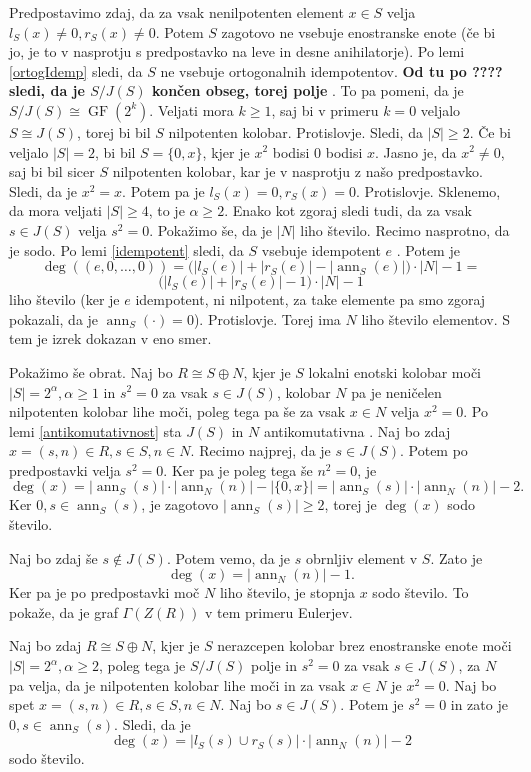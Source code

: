 \documentclass[a4paper, 12pt]{amsart}
\theoremstyle{definition} %
\theoremstyle{plain} %
\DeclareMathOperator{\ann}{ann}
\DeclareMathOperator{\GF}{GF}
\begin{document}
Predpostavimo zdaj, da za vsak nenilpotenten element $x \in S$ velja $l_S(x) \neq 0, r_S(x) \neq 0$. Potem $S$ zagotovo ne vsebuje enostranske enote (če bi jo, je to v nasprotju s predpostavko na leve in desne anihilatorje). Po lemi \ref{ortogIdemp} sledi, da $S$ ne vsebuje ortogonalnih idempotentov. {	\bf Od tu po ???? sledi, da je $S/J(S)$  končen obseg, torej polje }. To pa pomeni, da je $S/J(S) \cong \GF(2^k)$. Veljati mora $k\ge 1$, saj bi v primeru $k=0$ veljalo $S \cong J(S)$, torej bi bil $S$ nilpotenten kolobar. Protislovje. Sledi, da $|S| \ge 2$. Če bi veljalo $|S| = 2$, bi bil $S=\{0,x\}$, kjer je $x^2$ bodisi $0$ bodisi $x$. Jasno je, da $x^2 \neq 0$, saj bi bil sicer $S$ nilpotenten kolobar, kar je v nasprotju z našo predpostavko. Sledi, da je $x^2 = x$. Potem pa je $l_S(x) = 0, r_S(x) = 0$. Protislovje. Sklenemo, da mora veljati $|S| \ge 4$, to je $\alpha \ge 2$. Enako kot zgoraj sledi tudi, da za vsak $ s \in J(S)$ velja $s^2 = 0$. Pokažimo še, da je $|N| $ liho število. Recimo nasprotno, da je sodo. Po lemi \ref{idempotent} sledi, da $S$ vsebuje idempotent $e$ . Potem je 
$$
\deg((e,0,\dots,0)) = \big(|l_S(e)| + |r_S(e)| - |\ann_S(e)| \big)\cdot |N| -1 =
$$
$$
 \big(|l_S(e)| + |r_S(e)| - 1 \big)\cdot |N| -1
$$
liho število (ker je $e$ idempotent, ni nilpotent, za take elemente pa smo zgoraj pokazali, da je $\ann_S(\cdot) = 0$). Protislovje. Torej ima $N$ liho število elementov. S tem je izrek dokazan v eno smer.

Pokažimo še obrat. Naj bo $R\cong S\oplus N$, kjer je $S$ lokalni enotski kolobar moči $|S| = 2^{\alpha}, \alpha \ge 1$ in $s^2 = 0 $ za vsak $s\in J(S)$, kolobar $N$ pa je neničelen nilpotenten kolobar lihe moči, poleg tega pa še za vsak $x\in N$ velja $x^2 = 0$. Po lemi \ref{antikomutativnost} sta $J(S)$ in $N$ antikomutativna . Naj bo zdaj $x= (s,n) \in R, s\in S, n\in N$. Recimo najprej, da je $s\in J(S)$. Potem po predpostavki velja $s^2 = 0$. Ker pa je poleg tega še $n^2 = 0$, je 
$$
\deg(x) = |\ann_S(s)|\cdot|\ann_N(n)| - |\{0,x\}| =   |\ann_S(s)|\cdot|\ann_N(n)| - 2.
$$
Ker $0,s\in \ann_S(s)$, je zagotovo $|\ann_S(s)|\ge 2$, torej je $\deg(x)$ sodo število.

Naj bo zdaj še $s\notin J(S)$. Potem vemo, da je $s$ obrnljiv element v $S$. Zato je 
$$
\deg(x) = |\ann_N(n)| - 1.
$$
Ker pa je po predpostavki moč $N$ liho število, je stopnja $x$ sodo število. To pokaže, da je graf $\Gamma(Z(R))$ v tem primeru Eulerjev.

Naj bo zdaj $R\cong S\oplus N$, kjer je $S$ nerazcepen kolobar brez enostranske enote moči $|S| = 2^{\alpha}, \alpha \ge 2$, poleg tega je $S/J(S)$ polje in $s^2 = 0$ za vsak $s\in J(S)$, za $N$ pa velja, da je nilpotenten kolobar lihe moči in za vsak $x\in N$ je $x^2 = 0$. Naj bo spet $x=(s,n)\in R, s\in S, n\in N$. Naj bo $s\in J(S)$. Potem je $s^2 = 0$ in zato je $0,s \in \ann_S(s)$. Sledi, da je  
$$
\deg(x) = |l_S(s) \cup r_S(s)|\cdot |\ann_N(n)| - 2
$$
sodo število.
\end{document}
